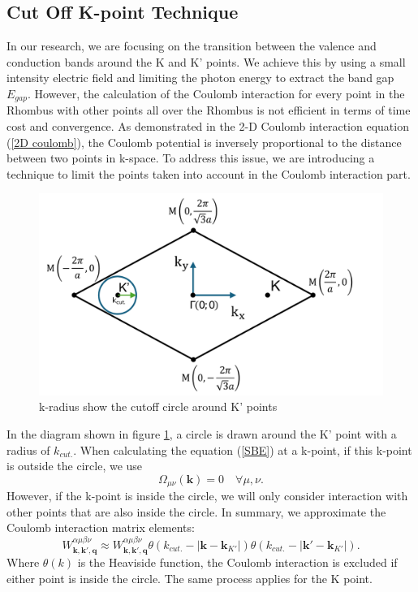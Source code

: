 \documentclass[12pt,english,a4paper]{article}
\begin{document}
\subsection{Cut Off K-point Technique}
\quad In our research, we are focusing on the transition between the valence and conduction bands around the K and K' points. We achieve this by using a small intensity electric field and limiting the photon energy to extract the band gap $E_{gap}$. However, the calculation of the Coulomb interaction for every point in the Rhombus with other points all over the Rhombus is not efficient in terms of time cost and convergence. As demonstrated in the 2-D Coulomb interaction equation (\ref{2D coulomb}), the Coulomb potential is inversely proportional to the distance between two points in k-space. To address this issue, we are introducing a technique to limit the points taken into account in the Coulomb interaction part.\\\null
\begin{figure}[ht]
	\begin{center}
		\includegraphics[width = 0.5 \linewidth]{Images/kcutoff.pdf}
		\caption{k-radius show the cutoff circle around K' points}
		\label{k cutoff}
	\end{center}
\end{figure}
\quad In the diagram shown in figure \ref{k cutoff}, a circle is drawn around the K' point with a radius of $k_{cut.}$. When calculating the equation (\ref{SBE}) at a k-point, if this k-point is outside the circle, we use
$$\Omega_{\mu \nu}(\textbf{k}) = 0 \quad \forall \mu,\nu.$$
\quad However, if the k-point is inside the circle, we will only consider interaction with other points that are also inside the circle. In summary, we approximate the Coulomb interaction matrix elements:
$$W^{\alpha \mu \beta \nu}_{\textbf{k},\textbf{k}',\textbf{q}} \approx W^{\alpha \mu \beta \nu}_{\textbf{k},\textbf{k}',\textbf{q}} \theta(k_{cut.} - |\textbf{k} - \textbf{k}_{K'}|) \theta(k_{cut.} - |\textbf{k}' - \textbf{k}_{K'}|).$$
\quad Where $\theta(k)$ is the Heaviside function, the Coulomb interaction is excluded if either point is inside the circle. The same process applies for the K point.
\end{document}
